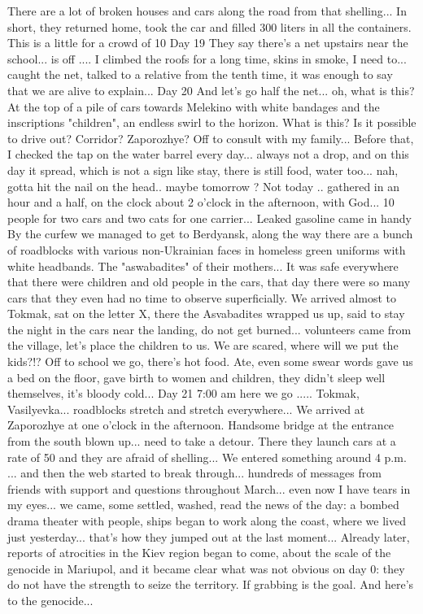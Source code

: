 There are a lot of broken houses and cars along the road from that shelling...
In short, they returned home, took the car and filled 300 liters in all the containers. This is a little for a crowd of 10
Day 19
They say there's a net upstairs near the school... is off .... I climbed the roofs for a long time, skins in smoke, I need to... caught the net, talked to a relative from the tenth time, it was enough to say that we are alive to explain...
Day 20
And let's go half the net... oh, what is this? At the top of a pile of cars towards Melekino with white bandages and the inscriptions "children", an endless swirl to the horizon. What is this? Is it possible to drive out? Corridor? Zaporozhye? Off to consult with my family... Before that, I checked the tap on the water barrel every day... always not a drop, and on this day it spread, which is not a sign like stay, there is still food, water too... nah, gotta hit the nail on the head.. maybe tomorrow ? Not today .. gathered in an hour and a half, on the clock about 2 o'clock in the afternoon, with God... 10 people for two cars and two cats for one carrier... Leaked gasoline came in handy
By the curfew we managed to get to Berdyansk, along the way there are a bunch of roadblocks with various non-Ukrainian faces in homeless green uniforms with white headbands. The "aswabadites" of their mothers... It was safe everywhere that there were children and old people in the cars, that day there were so many cars that they even had no time to observe superficially.
We arrived almost to Tokmak, sat on the letter X, there the Asvabadites wrapped us up, said to stay the night in the cars near the landing, do not get burned... volunteers came from the village, let's place the children to us. We are scared, where will we put the kids?!? Off to school we go, there's hot food.
Ate, even some swear words gave us a bed on the floor, gave birth to women and children, they didn't sleep well themselves, it's bloody cold...
Day 21
7:00 am here we go ..... Tokmak, Vasilyevka... roadblocks stretch and stretch everywhere... We arrived at Zaporozhye at one o'clock in the afternoon. Handsome bridge at the entrance from the south blown up... need to take a detour. There they launch cars at a rate of 50 and they are afraid of shelling... We entered something around 4 p.m. ... and then the web started to break through... hundreds of messages from friends with support and questions throughout March... even now I have tears in my eyes... we came, some settled, washed, read the news of the day: a bombed drama theater with people, ships began to work along the coast, where we lived just yesterday... that's how they jumped out at the last moment...
Already later, reports of atrocities in the Kiev region began to come, about the scale of the genocide in Mariupol, and it became clear what was not obvious on day 0: they do not have the strength to seize the territory. If grabbing is the goal. And here's to the genocide...
